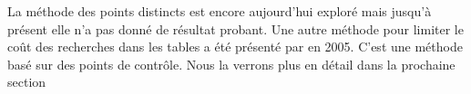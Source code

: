 
		La méthode des points distincts est encore aujourd'hui exploré mais jusqu'à présent elle n'a pas donné de résultat probant. Une autre méthode pour limiter le coût des recherches dans les tables a été présenté par \cite{checkpoints} en 2005. C'est une méthode basé sur des points de contrôle. Nous la verrons plus en détail dans la prochaine section
		
\endinput{}
